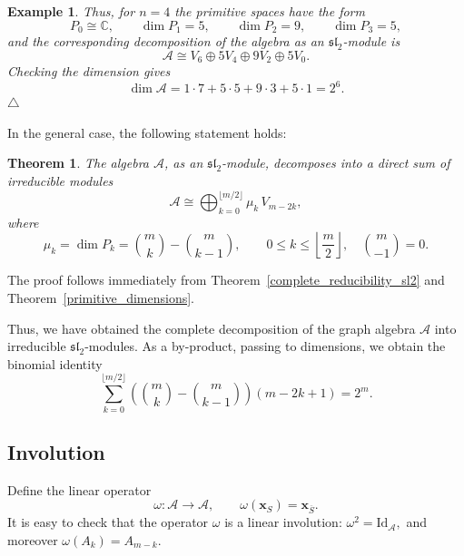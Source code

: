\documentclass[12pt,reqno]{amsart}
\newtheorem{theorem}{Theorem}[section]
\newtheorem{example}{Example}[section]
\begin{document}
\begin{example}
{Thus, for $n=4$ the primitive spaces have the form
$$
P_0\cong \mathbb C,\qquad
\dim P_1=5,\qquad
\dim P_2=9,\qquad
\dim P_3=5,
$$
and the corresponding decomposition of the algebra as an
$\mathfrak{sl}_2$-module is
$$
\mathcal A
\cong
V_6\oplus 5V_4\oplus 9V_2\oplus 5V_0.
$$
Checking the dimension gives
$$
\dim\mathcal A
=
1\cdot 7+5\cdot 5+9\cdot 3+5\cdot 1
=
2^6.
$$
}
$\triangle$ \end{example}


In the general case, the following statement holds:

\begin{theorem}\label{irred_decomp_A}
The algebra $\mathcal A$, as an $\mathfrak{sl}_2$-module, decomposes into a
direct sum of irreducible modules
\begin{equation}
\mathcal A
\cong
\bigoplus_{k=0}^{\lfloor m/2\rfloor}
\mu_k\,V_{m-2k},
\end{equation}
where
\begin{equation}
\mu_k
=
\dim P_k
=
\binom{m}{k}-\binom{m}{k-1},
\qquad
0\le k\le \left\lfloor\frac m2\right\rfloor, \quad \binom{m}{-1}=0.
\end{equation}
\end{theorem}

The proof follows immediately from Theorem~\ref{complete_reducibility_sl2}
and Theorem~\ref{primitive_dimensions}.

Thus, we have obtained the complete decomposition of the graph algebra
$\mathcal A$ into irreducible $\mathfrak{sl}_2$-modules.
As a by-product, passing to dimensions, we obtain the  binomial
identity
$$
\sum_{k=0}^{\lfloor m/2\rfloor}
\left(\binom{m}{k}-\binom{m}{k-1}\right)(m-2k+1)=2^m.
$$


\subsection{Involution}

Define the linear operator
\begin{equation}\label{involution}
\omega:\mathcal A\to\mathcal A,
\qquad
\omega(\boldsymbol{x}_S)=\boldsymbol{x}_{\overline S}.
\end{equation}
It is easy to check that the operator $\omega$ is a linear involution:
$
\omega^2=\mathrm{Id}_{\mathcal A},
$
and moreover
$
\omega(A_k)=A_{m-k}.
$
\end{document}
